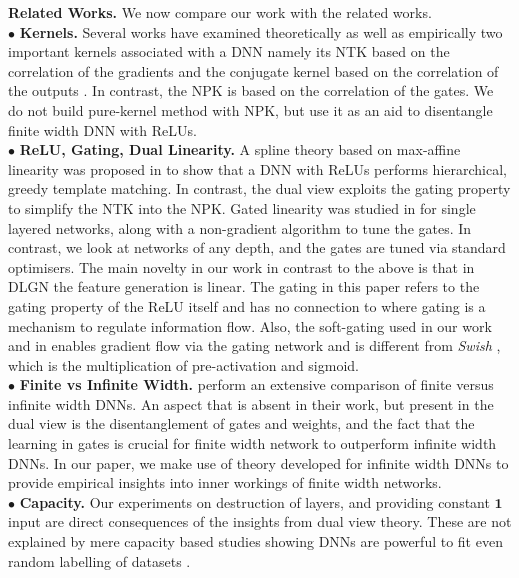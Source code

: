 \textbf{Related Works.} We now compare our work with the related works.\\
$\bullet$ \textbf{Kernels.} Several works have examined theoretically as well as empirically two important kernels associated with a DNN namely its NTK based on the correlation of the gradients and the conjugate kernel based on the correlation of the outputs \citep{spectra,laplace,belkin,genntk,disentangling,ntk,arora2019exact,convgp,fcgp,lee2020finite}. In contrast, the NPK is based on the correlation of the gates. We do not build pure-kernel method with NPK, but use it as an aid to disentangle finite width DNN with ReLUs.\\  %
$\bullet$ \textbf{ReLU, Gating, Dual Linearity.} A spline theory based on max-affine linearity was proposed in \citep{balestriero2018spline,balestriero2018hard} to show that a DNN with ReLUs performs hierarchical, greedy template matching. In contrast, the dual view exploits the gating property to simplify the NTK into the NPK. Gated linearity was studied in \citep{sss} for single layered networks, along with a non-gradient algorithm to tune the gates. In contrast, we look at networks of any depth, and the gates are tuned via standard optimisers. The main novelty in our work in contrast to the above is that in DLGN the feature generation is linear. The gating in this paper refers to the gating property of the ReLU itself and has no connection to \citep{highway}  where gating is a mechanism to regulate information flow. Also, the soft-gating used in our work and in \citep{npk} enables gradient flow via the gating network and is different from \emph{Swish} \citep{swish}, which is the multiplication of pre-activation and sigmoid.\\
$\bullet$ \textbf{Finite vs Infinite Width.} \cite{finitevsinfinite} perform an extensive comparison of finite versus infinite width DNNs. An aspect that is absent in their work, but present in the dual view is the disentanglement of gates and weights, and the fact that the learning in gates is crucial for finite width network to outperform infinite width DNNs. In our paper, we make use of theory developed for infinite width DNNs to provide empirical insights into inner workings of finite width networks.\\
$\bullet$ \textbf{Capacity.} Our experiments on destruction of layers, and providing constant $\mathbf{1}$ input are direct consequences of the insights from dual view theory. These are not explained by mere capacity based studies showing  DNNs are powerful to fit even random labelling of datasets \citep{ben}.

